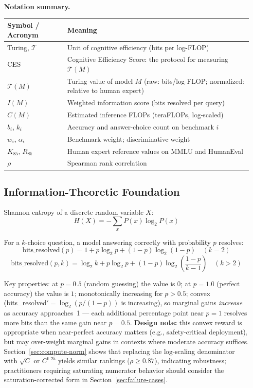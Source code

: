 \documentclass[12pt]{article}
\begin{document}
\noindent\textbf{Notation summary.}
\begin{center}
\small
\begin{tabular}{ll}
\toprule
\textbf{Symbol / Acronym} & \textbf{Meaning} \\
\midrule
Turing, $\mathcal{T}$ & Unit of cognitive efficiency (bits per log-FLOP) \\
CES & Cognitive Efficiency Score: the protocol for measuring $\mathcal{T}(M)$ \\
$\mathcal{T}(M)$ & Turing value of model $M$ (raw: bits/log-FLOP; normalized: relative to human expert) \\
$I(M)$ & Weighted information score (bits resolved per query) \\
$C(M)$ & Estimated inference FLOPs (teraFLOPs, log-scaled) \\
$b_i$, $k_i$ & Accuracy and answer-choice count on benchmark $i$ \\
$w_i$, $\alpha_i$ & Benchmark weight; discriminative weight \\
$K_{85}$, $R_{85}$ & Human expert reference values on MMLU and HumanEval \\
$\rho$ & Spearman rank correlation \\
\bottomrule
\end{tabular}
\end{center}

\subsection{Information-Theoretic Foundation}

Shannon entropy of a discrete random variable $X$:
\begin{equation}
H(X) = -\sum_x P(x)\log_2 P(x)
\end{equation}

For a $k$-choice question, a model answering correctly with probability $p$ resolves:
\begin{equation}
\text{bits\_resolved}(p) = 1 + p\log_2 p + (1-p)\log_2(1-p)   \quad (k=2)
\end{equation}
\begin{equation}
\text{bits\_resolved}(p,k) = \log_2 k + p\log_2 p + (1-p)\log_2\!\left(\frac{1-p}{k-1}\right)   \quad (k>2)
\end{equation}

Key properties: at $p=0.5$ (random guessing) the value is $0$; at $p=1.0$
(perfect accuracy) the value is $1$; monotonically increasing for $p > 0.5$;
convex (bits\_resolved$' = \log_2(p/(1-p))$ is increasing), so marginal gains \textit{increase} as accuracy approaches~1 --- each additional percentage point near $p=1$ resolves more bits than the same gain near $p=0.5$. \textbf{Design note:} this convex reward is appropriate when near-perfect accuracy matters (e.g., safety-critical deployment), but may over-weight marginal gains in contexts where moderate accuracy suffices. Section~\ref{sec:compute-norm} shows that replacing the log-scaling denominator with $\sqrt{C}$ or $C^{0.25}$ yields similar rankings ($\rho \geq 0.87$), indicating robustness; practitioners requiring saturating numerator behavior should consider the saturation-corrected form in Section~\ref{sec:failure-cases}.
\end{document}

